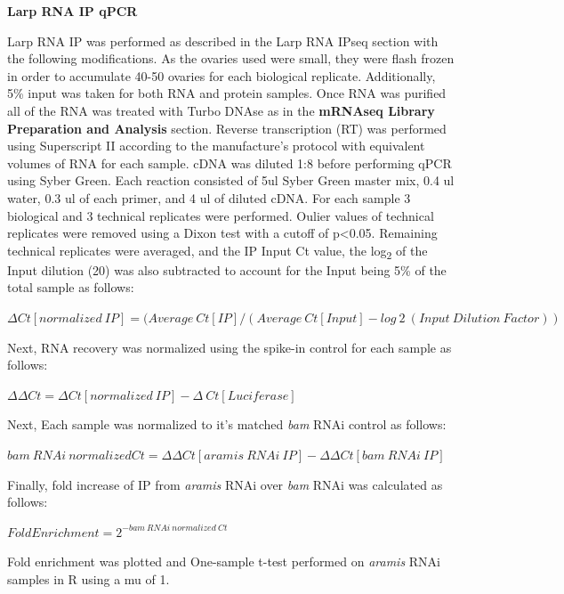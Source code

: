 \documentclass[12pt,oneside]{reedthesis}
\begin{document}
\textbf{Larp RNA IP qPCR}

Larp RNA IP was performed as described in the Larp RNA IPseq section with the following modifications. As the ovaries used were small, they were flash frozen in order to accumulate 40-50 ovaries for each biological replicate. Additionally, 5\% input was taken for both RNA and protein samples. Once RNA was purified all of the RNA was treated with Turbo DNAse as in the \textbf{mRNAseq Library Preparation and Analysis} section. Reverse transcription (RT) was performed using Superscript II according to the manufacture's protocol with equivalent volumes of RNA for each sample. cDNA was diluted 1:8 before performing qPCR using Syber Green. Each reaction consisted of 5ul Syber Green master mix, 0.4 ul water, 0.3 ul of each primer, and 4 ul of diluted cDNA. For each sample 3 biological and 3 technical replicates were performed. Oulier values of technical replicates were removed using a Dixon test with a cutoff of p\textless0.05. Remaining technical replicates were averaged, and the IP Input Ct value, the log\textsubscript{2} of the Input dilution (20) was also subtracted to account for the Input being 5\% of the total sample as follows:

\textbf{\hfill\break
}

\(\Delta Ct[normalized\ IP] = (Average\ Ct[IP]/(Average\ Ct[Input] - log~2~(Input\ Dilution\ Factor))\)

\textbf{\hfill\break
}

Next, RNA recovery was normalized using the spike-in control for each sample as follows:

\textbf{\hfill\break
}

\(\Delta \Delta Ct = \Delta Ct[normalized\ IP]-\Delta\ Ct[Luciferase]\)

\textbf{\hfill\break
}

Next, Each sample was normalized to it's matched \emph{bam} RNAi control as follows:

\textbf{\hfill\break
}

\(bam\ RNAi\ normalized Ct= \Delta \Delta Ct[aramis\ RNAi\ IP] - \Delta \Delta Ct[bam\ RNAi\ IP]\)

Finally, fold increase of IP from \emph{aramis} RNAi over \emph{bam} RNAi was calculated as follows:

\textbf{\hfill\break
}

\(Fold Enrichment = 2^{-bam\ RNAi\ normalized\ Ct}\)

\textbf{\hfill\break
}

Fold enrichment was plotted and One-sample t-test performed on \emph{aramis} RNAi samples in R using a mu of 1.
\end{document}
